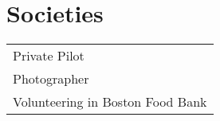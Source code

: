 \documentclass[letterpaper]{lyu-resume} %
\begin{document}
\begin{minipage}[t]{0.66\textwidth}
\sectionspace %


\section{Societies} 

\begin{tabular}{l}

\textbullet{} Private Pilot\\
\textbullet{} Photographer\\
\textbullet{} Volunteering in Boston Food Bank\\
\end{tabular}

\sectionspace %


\end{minipage} %








\end{document}
